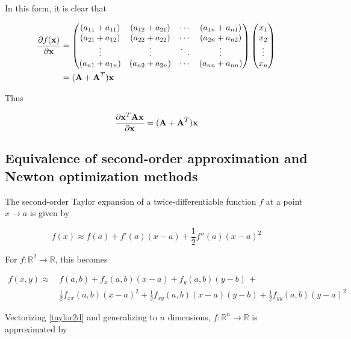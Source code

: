 \documentclass{article}
\newcommand{\R}{\mathbb{R}}
\newcommand{\vect}[1]{\textbf{\textrm{#1}}}
\newcommand{\pd}[2]{\frac{\partial {#1}}{\partial {#2}}}
\begin{document}
In this form, it is clear that

\begin{align*}
	\pd{f(\vect{x})}{\vect{x}} & = 
	\begin{pmatrix}
		(a_{11} + a_{11}) & (a_{12} + a_{21}) & \cdots & (a_{1n} + a_{n1}) \\
		(a_{21} + a_{12}) & (a_{22} + a_{22}) & \cdots & (a_{2n} + a_{n2}) \\
		\vdots & \vdots & \ddots & \vdots \\
		(a_{n1} + a_{1n}) & (a_{n2} + a_{2n}) & \cdots & (a_{nn} + a_{nn}) 
	\end{pmatrix} 
	\begin{pmatrix}
		x_1 \\ 
		x_2 \\ 
		\vdots \\ 
		x_n
	\end{pmatrix} \\
	& = (\vect{A} + \vect{A}^{T})\vect{x}
\end{align*}

Thus

\begin{equation} \label{scalargradqf}
	\pd{\vect{x}^{T}\vect{Ax}}{\vect{x}} = (\vect{A} + \vect{A}^{T})\vect{x}
\end{equation}

\subsection{Equivalence of second-order approximation and Newton optimization methods}
The second-order Taylor expansion of a twice-differentiable function $f$ at a point $x \rightarrow a$ is given by

\begin{equation} \label{taylor1d}
	f(x) \approx f(a) + f'(a)(x - a) + \frac{1}{2}f''(a)(x - a)^2
\end{equation}

For $f: \R^2 \rightarrow \R$, this becomes

\begin{align} \label{taylor2d}
	f(x,y) \approx \, & f(a,b) + f_x(a,b)(x - a) + f_y(a,b)(y - b) \, + \nonumber \\
					   & \frac{1}{2}f_{xx}(a,b)(x - a)^2 + \frac{1}{2}f_{xy}(a,b)(x - a)(y - b) + 
						 \frac{1}{2}f_{yy}(a,b)(y - a)^2 
\end{align}
 
Vectorizing \eqref{taylor2d} and generalizing to $n$ dimensions, $f: \R^n \rightarrow \R$ is approximated by
\end{document}
